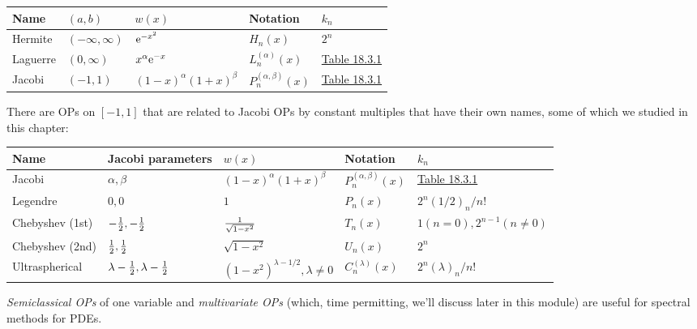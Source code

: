 \documentclass[12pt,landscape]{article}
\begin{document}
{\begin{tabular}
{l | l | l | l | l}
Name & $(a,b)$ & $w(x)$ & Notation & $k_n$ \\
\hline
Hermite & $(-\infty,\infty)$ & ${\rm e}^{-x^2}$ & $H_n(x)$ & $2^n$ \\
Laguerre & $(0,\infty)$ & $x^\alpha {\rm e}^{-x}$ & $L_n^{(\alpha)}(x)$ & \href{http://dlmf.nist.gov/18.3}{Table 18.3.1} \\
Jacobi & $(-1,1)$ & $(1-x)^{\alpha} (1+x)^\beta$ & $P_n^{(\alpha,\beta)}(x)$ & \href{http://dlmf.nist.gov/18.3}{Table 18.3.1} \\
\end{tabular}
There are OPs on $[-1, 1]$ that are related to Jacobi OPs by constant multiples that have their own names, some of which we studied in this chapter:

\begin{tabular}
{l | l | l | l | l}
Name & Jacobi parameters & $w(x)$ & Notation & $k_n$ \\
\hline
Jacobi & $\alpha,\beta$ & $(1-x)^{\alpha} (1+x)^\beta$ & $P_n^{(\alpha,\beta)}(x)$ & \href{http://dlmf.nist.gov/18.3}{Table 18.3.1} \\
Legendre & $0,0$ & $1$ & $P_n(x)$ & $2^n(1/2)_n/n!$ \\
Chebyshev (1st) & $-{1 \over 2},-{1 \over 2}$ & $1 \over \sqrt{1-x^2}$ & $T_n(x)$ & $1 (n=0), 2^{n-1} (n \neq 0)$ \\
Chebyshev (2nd) & ${1 \over 2},{1 \over 2}$ & $\sqrt{1-x^2}$ & $U_n(x)$ & $2^n$ \\
Ultraspherical & $\lambda-{1 \over 2},\lambda-{1 \over 2}$ & $(1-x^2)^{\lambda - 1/2}, \lambda \neq 0$ & $C_n^{(\lambda)}(x)$ & $2^n(\lambda)_n/n!$ \\
\end{tabular}
\emph{Semiclassical OPs} of one variable and \emph{multivariate OPs} (which, time permitting, we'll discuss later in this module) are useful for spectral methods for PDEs.


}
\end{document}
